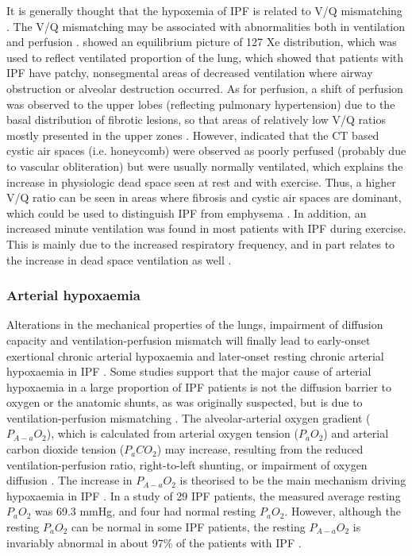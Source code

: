 It is generally thought that the hypoxemia of IPF is related to V/Q mismatching \citep{wagner1976distribution,crystal1976idiopathic,american2000idiopathic}. The V/Q mismatching may be associated with abnormalities both in ventilation and perfusion \citep{crystal1976idiopathic,strickland1993cause}. \cite{crystal1976idiopathic} showed an equilibrium picture of 127 Xe distribution, which was used to reflect ventilated proportion of the lung, which showed that patients with IPF have patchy, nonsegmental areas of decreased ventilation where airway obstruction or alveolar destruction occurred. As for perfusion, a shift of perfusion was observed to the upper lobes (reflecting pulmonary hypertension) due to the basal distribution of fibrotic lesions, so that areas of relatively low V/Q ratios mostly presented in the upper zones \citep{crystal1976idiopathic}. However, \cite{strickland1993cause} indicated that the CT based cystic air spaces (i.e. honeycomb) were observed as poorly perfused (probably due to vascular obliteration) but were usually  normally ventilated, which explains the increase in physiologic dead space seen at rest and with exercise. Thus, a higher V/Q ratio can be seen in areas where fibrosis and cystic air spaces are dominant, which could be used to distinguish IPF from emphysema \citep{strickland1993cause}. In addition, an increased minute ventilation was found in most patients with IPF during exercise. This is mainly due to the increased respiratory frequency, and in part relates to the increase in dead space ventilation as well \citep{american2000idiopathic}.

\subsubsection{Arterial hypoxaemia}
Alterations in the mechanical properties of the lungs, impairment of diffusion capacity and ventilation-perfusion mismatch will finally lead to early-onset exertional chronic arterial hypoxaemia and later-onset resting chronic arterial hypoxaemia in IPF \citep{hempleman1991estimating, hughes1991dlco, plantier2018physiology}. Some studies support that the major cause of arterial hypoxaemia in a large proportion of IPF patients is not the diffusion barrier to oxygen or the anatomic shunts, as was originally suspected, but is due to ventilation-perfusion mismatching \citep{ finley1962cause, wagner1976distribution, american2000idiopathic}. The alveolar-arterial oxygen gradient ($P_{A-a}O_2$), which is calculated from arterial oxygen tension ($P_{a}O_2$) and arterial carbon dioxide tension ($P_{a}CO_2$) may increase, resulting from the reduced ventilation-perfusion ratio, right-to-left shunting, or impairment of oxygen diffusion \citep{plantier2018physiology}. The increase in $P_{A-a}O_2$ is theorised to be the main mechanism driving hypoxaemia in IPF \citep{agusti1991mechanisms}. In a study of 29 IPF patients, the measured average resting $P_a O_2$ was 69.3 mmHg, and four had normal resting $P_{a}O_2$. However, although the resting $P_{a}O_2$ can be normal in some IPF patients, the resting $P_{A-a}O_2$ is invariably abnormal in about 97\% of the patients with IPF \citep{crystal1976idiopathic}.

